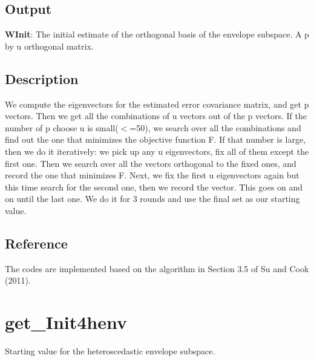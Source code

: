 \documentclass[a4paper,11pt,openany]{memoir}
\begin{document}
\subsection*{Output}

\begin{par}
\textbf{WInit}: The initial estimate of the orthogonal basis of the envelope subspace. A p by u orthogonal matrix.
\end{par} \vspace{1em}


\subsection*{Description}

\begin{par}
We compute the eigenvectors for the estimated error covariance matrix, and get p vectors.  Then we get all the combinations of u vectors out of the p vectors. If the number of p choose u is small(\ensuremath{<}=50), we search over all the combinations and find out the one that minimizes the objective function F. If that number is large, then we do it iteratively: we pick up any u eigenvectors, fix all of them except the first one. Then we search over all the vectors orthogonal to the fixed ones, and record the one that minimizes F. Next, we fix the first u eigenvectors again but this time search for the second one, then we record the vector. This goes on and on until the last one. We do it for 3 rounds and use the final set as our starting value.
\end{par} \vspace{1em}


\subsection*{Reference}

\begin{par}
The codes are implemented based on the algorithm in Section 3.5 of Su and Cook (2011).
\end{par} \vspace{1em}

\newpage

\rmfamily
\color{black}\section{get\_Init4henv}

\begin{par}
Starting value for the heteroscedastic envelope subspace.
\end{par} \vspace{1em}
\end{document}
